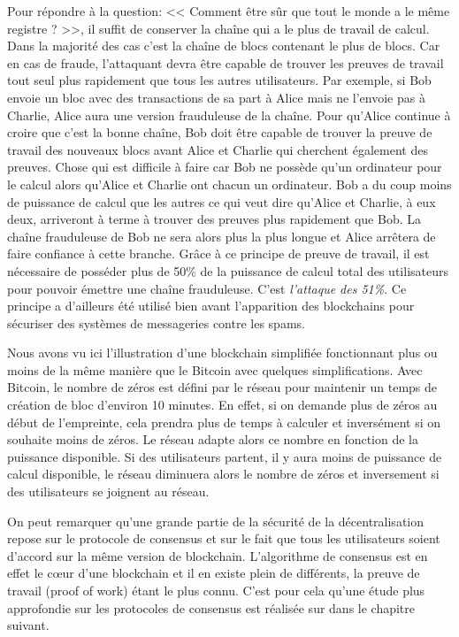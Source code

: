 Pour répondre à la question: << Comment être sûr que tout le monde a le même registre ? >>, il suffit de conserver la chaîne qui a le plus de travail de calcul. Dans la majorité des cas c'est la chaîne de blocs contenant le plus de blocs. Car en cas de fraude, l'attaquant devra être capable de trouver les preuves de travail tout seul plus rapidement que tous les autres utilisateurs. Par exemple, si Bob envoie un bloc avec des transactions de sa part à Alice mais ne l'envoie pas à Charlie, Alice aura une version frauduleuse de la chaîne. Pour qu'Alice continue à croire que c'est la bonne chaîne, Bob doit être capable de trouver la preuve de travail des nouveaux blocs avant Alice et Charlie qui cherchent également des preuves. Chose qui est difficile à faire car Bob ne possède qu'un ordinateur pour le calcul alors qu'Alice et Charlie ont chacun un ordinateur. Bob a du coup moins de puissance de calcul que les autres ce qui veut dire qu'Alice et Charlie, à eux deux, arriveront à terme à trouver des preuves plus rapidement que Bob. La chaîne frauduleuse de Bob ne sera alors plus la plus longue et Alice arrêtera de faire confiance à cette branche. Grâce à ce principe de preuve de travail, il est nécessaire de posséder plus de 50\% de la puissance de calcul total des utilisateurs pour pouvoir émettre une chaîne frauduleuse. C'est \emph{l'attaque des 51\%}. Ce principe a d'ailleurs été utilisé bien avant l'apparition des blockchains pour sécuriser des systèmes de messageries contre les spams.

Nous avons vu ici l'illustration d'une blockchain simplifiée fonctionnant plus ou moins de la même manière que le Bitcoin avec quelques simplifications. Avec Bitcoin, le nombre de zéros est défini par le réseau pour maintenir un temps de création de bloc d'environ 10 minutes. En effet, si on demande plus de zéros au début de l'empreinte, cela prendra plus de temps à calculer et inversément si on souhaite moins de zéros. Le réseau adapte alors ce nombre en fonction de la puissance disponible. Si des utilisateurs partent, il y aura moins de puissance de calcul disponible, le réseau diminuera alors le nombre de zéros et inversement si des utilisateurs se joignent au réseau.

On peut remarquer qu'une grande partie de la sécurité de la décentralisation repose sur le protocole de consensus et sur le fait que tous les utilisateurs soient d'accord sur la même version de blockchain. L'algorithme de consensus est en effet le cœur d'une blockchain et il en existe plein de différents, la preuve de travail (proof of work) étant le plus connu. C'est pour cela qu'une étude plus approfondie sur les protocoles de consensus est réalisée sur dans le chapitre suivant.
